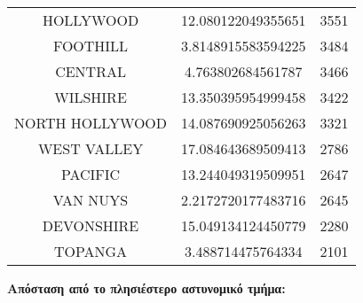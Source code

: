 \documentclass{article}
\begin{document}
\begin{center}
\begin{tabular}{|c|c|c|}
HOLLYWOOD & 12.080122049355651 & 3551 \\
FOOTHILL & 3.8148915583594225 & 3484 \\
CENTRAL & 4.763802684561787 & 3466 \\
WILSHIRE & 13.350395954999458 & 3422 \\
NORTH HOLLYWOOD & 14.087690925056263 & 3321 \\
WEST VALLEY & 17.084643689509413 & 2786 \\
PACIFIC & 13.244049319509951 & 2647 \\
VAN NUYS & 2.2172720177483716 & 2645 \\
DEVONSHIRE & 15.049134124450779 & 2280 \\
TOPANGA & 3.488714475764334 & 2101 \\
\hline
\end{tabular}
\end{center}

\vspace{50mm} %

\noindent \textbf{Απόσταση από το πλησιέστερο αστυνομικό τμήμα:}
\end{document}
